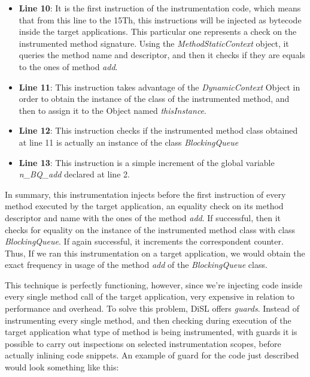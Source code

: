 \documentclass[]{usiinfthesis}
\begin{document}
\begin{itemize}
    \item \textbf{Line 10}: It is the first instruction of the instrumentation code, which means that from this line to the 15Th, this instructions will be injected as bytecode inside the target applications. This particular one represents a check on the instrumented method signature. Using the \textit{MethodStaticContext} object, it queries the method name and descriptor, and then it checks if they are equals to the ones of method \textit{add}.
    
    \item \textbf{Line 11}: This instruction takes advantage of the \textit{DynamicContext} Object in order to obtain the instance of the class of the instrumented method, and then to assign it to the Object named \textit{thisInstance}.
    
    \item \textbf{Line 12}: This instruction checks if the instrumented method class obtained at line 11 is actually an instance of the class \textit{BlockingQueue}
    
    \item \textbf{Line 13}: This instruction is a simple increment of the global variable \textit{n\_BQ\_add} declared at line 2.
\end{itemize}
In summary, this instrumentation injects before the first instruction of every method executed by the target application, an equality check on its method descriptor and name with the ones of the method \textit{add}. If successful, then it checks for equality on the instance of the instrumented method class with class \textit{BlockingQueue}. If again successful, it increments the correspondent counter. Thus, If we ran this instrumentation on a target application, we would obtain the exact frequency in usage of the method \textit{add} of the \textit{BlockingQueue} class. 

\noindent
This technique is perfectly functioning, however, since we're injecting code inside every single method call of the target application, very expensive in relation to performance and overhead. To solve this problem, DiSL offers \textit{guards}. Instead of instrumenting every single method, and then checking during execution of the target application what type of method is being instrumented, with guards it is possible to carry out inspections on selected instrumentation scopes, before actually inlining code snippets. An example of guard for the code just described would look something like this:
\end{document}
